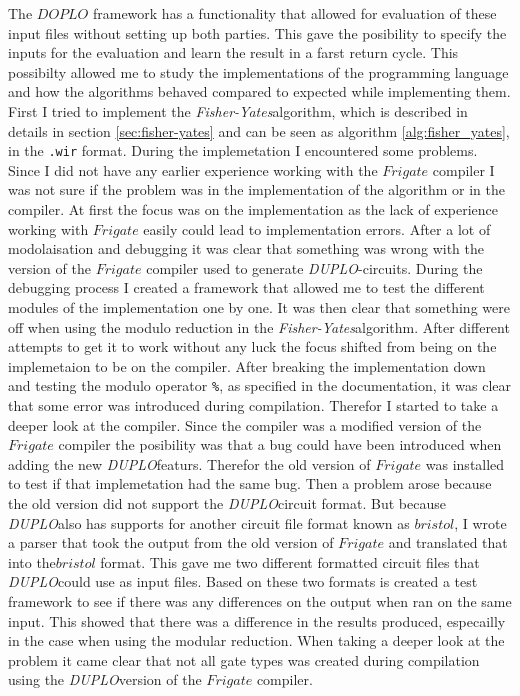 \documentclass[twoside,11pt,openright]{report}
\newcommand{\FY}{\textit{Fisher-Yates}}
\newcommand{\DUPLO}{\textit{DUPLO}}
\begin{document}
The $DOPLO$ framework has a functionality that allowed for evaluation of these input files without setting up both parties. This gave the posibility to specify the inputs for the evaluation and learn the result in a farst return cycle. This possibilty allowed me to study the implementations of the programming language and how the algorithms behaved compared to expected while implementing them. First I tried to implement the \FY algorithm, which is described in details in section \ref{sec:fisher-yates} and can be seen as algorithm \ref{alg:fisher_yates}, in the \verb|.wir| format. During the implemetation I encountered some problems. Since I did not have any earlier experience working with the $Frigate$ compiler I was not sure if the problem was in the implementation of the algorithm or in the compiler. At first the focus was on the implementation as the lack of experience working with $Frigate$ easily could lead to implementation errors. After a lot of modolaisation and debugging it was clear that something was wrong with the version of the $Frigate$ compiler used to generate \DUPLO-circuits. During the debugging process I created a framework that allowed me to test the different modules of the implementation one by one. It was then clear that something were off when using the modulo reduction in the \FY algorithm. After different attempts to get it to work without any luck the focus shifted from being on the implemetaion to be on the compiler. After breaking the implementation down and testing the modulo operator \verb|%|, as specified in the documentation, it was clear that some error was introduced during compilation. Therefor I started to take a deeper look at the compiler. Since the compiler was a modified version of the $Frigate$ compiler the posibility was that a bug could have been introduced when adding the new \DUPLO featurs. Therefor the old version of $Frigate$ was installed to test if that implemetation had the same bug. Then a problem arose because the old version did not support the \DUPLO circuit format. But because \DUPLO also has  supports for another circuit file format known as $bristol$, I wrote a parser that took the output from the old version of $Frigate$ and translated that into the$bristol$ format. This gave me two different formatted circuit files that \DUPLO could use as input files. Based on these two formats is created a test framework to see if there was any differences on the output when ran on the same input. This showed that there was a difference in the results produced, especailly in the case when using the modular reduction. When taking a deeper look at the problem it came clear that not all gate types was created during compilation using the \DUPLO version of the $Frigate$ compiler.
\end{document}
